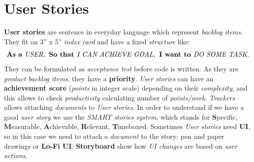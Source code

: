 \documentclass{article}
\begin{document}
\section{User Stories}
\textbf{User stories} are sentence in everyday language which represent \emph{backlog items}. They fit on 3'' x 5'' \emph{index card} and have a fixed \emph{structure} like: \[\textbf{As a} \emph{ USER},\textbf{ So that } \emph{I CAN ACHIEVE GOAL}, \textbf{ I want to}\emph{ DO SOME TASK}.\]
They can be formulated as \emph{acceptance test} before code is written. As they are \emph{product backlog items}, they have a \textbf{priority}. \emph{User stories} can have an \textbf{achievement score} (\emph{points} in integer scale) depending on their \emph{complexity}, and this allows to check \emph{productivity} calculating number of \emph{points/week}. \emph{Trackers} allows attaching \emph{documents} to \emph{User stories}. In order to understand if we have a good \emph{user story} we use the \emph{SMART stories system}, which stands for \textbf{S}pecific, \textbf{M}easurable, \textbf{A}chievable, \textbf{R}elevant, \textbf{T}imeboxed. Sometimes \emph{User stories} need \textbf{UI}, so in this case we need to attach a \emph{document} to the story: pen and paper drawings or \textbf{Lo-Fi UI}. \textbf{Storyboard} show how \emph{UI changes} are based on \emph{user actions}. 
\clearpage
\end{document}
